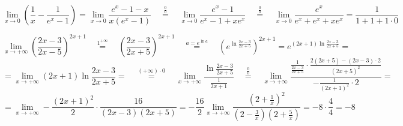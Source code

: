 \documentclass[a4paper,11.5pt]{article}
\begin{document}
	\begin{task}
		\[ \lim_{x\to0}\left(\frac{1}{x}-\frac{1}{e^x-1}\right)=\lim_{x\to0}\frac{e^x-1-x}{x(e^x-1)}\quad \overset{\frac{0}{0}}{=}\quad \lim_{x\to0}\frac{e^x-1}{e^x-1+xe^x}\quad \overset{\frac{0}{0}}{=}\quad \lim_{x\to0}\frac{e^x}{e^x+e^x+xe^x}=\frac{1}{1+1+1\cdot0} \]
	\end{task}
	\begin{task}
		\[ \lim_{x\to+\infty}\left(\frac{2x-3}{2x-5}\right)^{2x+1}\quad \overset{1^{+\infty}}{=}\quad \left(\frac{2x-3}{2x+5}\right)^{2x+1}\quad \overset{a=e^{\ln a}}{=}\quad \left(e^{\ln\frac{2x-3}{2x+5}}\right)^{2x+1}=e^{(2x+1)\ln\frac{2x-3}{2x+5}}=\]
		\[=\lim_{x\to+\infty}(2x+1)\ln\frac{2x-3}{2x+5}=\quad \overset{(+\infty)\cdot0}{=}\quad \lim_{x\to+\infty}\frac{\ln\frac{2x-3}{2x+5}}{\frac{1}{2x+1}}\quad \overset{\frac{0}{0}}{=}\quad \lim_{x\to+\infty}\frac{\displaystyle \frac{1}{\frac{2x-3}{2x+5}}\cdot\frac{2(2x+5)-(2x-3)\cdot2}{(2x+5)^2}}{\displaystyle -\frac{1}{(2x+1)^2}\cdot2} =\]
		\[ =\lim_{x\to+\infty}-\frac{(2x+1)^2}{2}\cdot\frac{16}{(2x-3)(2x+5)}=-\frac{16}{2}\lim_{x\to+\infty}\frac{\left(2+\frac{1}{x}\right)^2}{\left(2-\frac{3}{x}\right)\left(2+\frac{5}{x}\right)}=-8\cdot\frac{4}{4}=-8 \]
	\end{task}
\end{document}
